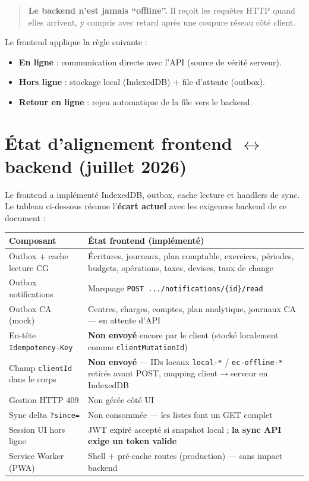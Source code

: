 \documentclass[12pt,a4paper]{report}
\begin{document}
\begin{quote}
\textbf{Le backend n'est jamais ``offline''.} Il reçoit les requêtes HTTP quand elles arrivent, y compris avec retard après une coupure réseau côté client.
\end{quote}

Le frontend applique la règle suivante :
\begin{itemize}
  \item \textbf{En ligne} : communication directe avec l'API (source de vérité serveur).
  \item \textbf{Hors ligne} : stockage local (IndexedDB) + file d'attente (outbox).
  \item \textbf{Retour en ligne} : rejeu automatique de la file vers le backend.
\end{itemize}

\section{État d'alignement frontend $\leftrightarrow$ backend (juillet 2026)}

Le frontend a implémenté IndexedDB, outbox, cache lecture et handlers de sync. Le tableau ci-dessous résume l'\textbf{écart actuel} avec les exigences backend de ce document :

\begin{longtable}{@{}p{5cm}p{8.5cm}@{}}
\hline
\textbf{Composant} & \textbf{État frontend (implémenté)} \\
\hline
\endhead
Outbox + cache lecture CG & Écritures, journaux, plan comptable, exercices, périodes, budgets, opérations, taxes, devises, taux de change \\
\hline
Outbox notifications & Marquage \texttt{POST .../notifications/\{id\}/read} \\
\hline
Outbox CA (mock) & Centres, charges, comptes, plan analytique, journaux CA --- en attente d'API \\
\hline
En-tête \texttt{Idempotency-Key} & \textbf{Non envoyé} encore par le client (stocké localement comme \texttt{clientMutationId}) \\
\hline
Champ \texttt{clientId} dans le corps & \textbf{Non envoyé} --- IDs locaux \texttt{local-*} / \texttt{ec-offline-*} retirés avant POST, mapping client$\rightarrow$serveur en IndexedDB \\
\hline
Gestion HTTP 409 & Non gérée côté UI \\
\hline
Sync delta \texttt{?since=} & Non consommée --- les listes font un GET complet \\
\hline
Session UI hors ligne & JWT expiré accepté si snapshot local ; \textbf{la sync API exige un token valide} \\
\hline
Service Worker (PWA) & Shell + pré-cache routes (production) --- sans impact backend \\
\hline
\end{longtable}
\end{document}
